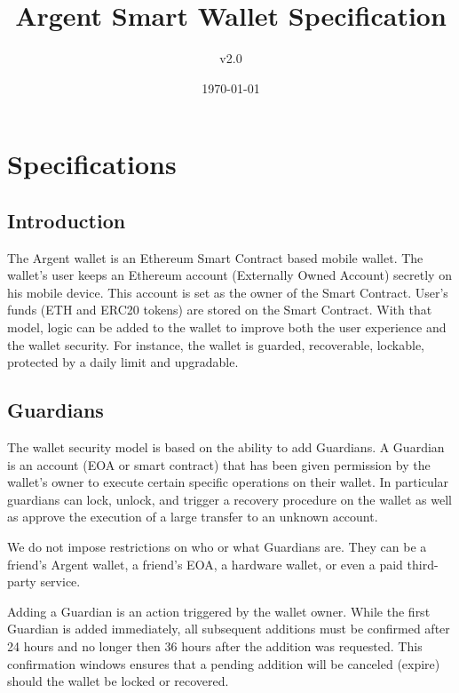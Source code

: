 \documentclass[12pt]{article}
\title{Argent Smart Wallet Specification}
\author{v2.0}
\date{\today}
\begin{document}
\maketitle

\section{Specifications}

\subsection{Introduction}

The Argent wallet is an Ethereum Smart Contract based mobile wallet. The wallet's user keeps an Ethereum account (Externally Owned Account) secretly on his mobile device. This account is set as the owner of the Smart Contract. User's funds (ETH and ERC20 tokens) are stored on the Smart Contract. With that model, logic can be added to the wallet to improve both the user experience and the wallet security. For instance, the wallet is guarded, recoverable, lockable, protected by a daily limit and upgradable.

\subsection{Guardians}

The wallet security model is based on the ability to add Guardians. A Guardian is an account (EOA or smart contract) that has been given permission by the wallet's owner to execute certain specific operations on their wallet. In particular guardians can lock, unlock, and trigger a recovery procedure on the wallet as well as approve the execution of a large transfer to an unknown account.

We do not impose restrictions on who or what Guardians are. They can be a friend's Argent wallet, a friend's EOA, a hardware wallet, or even a paid third-party service.

Adding a Guardian is an action triggered by the wallet owner. While the first Guardian is added immediately, all subsequent additions must be confirmed after 24 hours and no longer then 36 hours after the addition was requested. This confirmation windows ensures that a pending addition will be canceled (expire) should the wallet be locked or recovered.
\end{document}
